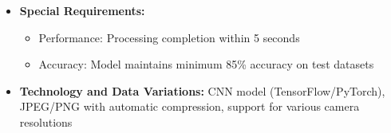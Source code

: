 \begin{itemize}
\begin{itemize}
        \item 4a. Confidence below 85\%: System provides top 3 alternative breed matches
        \item 6a. User disagrees: User can manually correct breed identification
    \end{itemize}
    \item \textbf{Special Requirements:}
    \begin{itemize}
        \item Performance: Processing completion within 5 seconds
        \item Accuracy: Model maintains minimum 85\% accuracy on test datasets
    \end{itemize}
    \item \textbf{Technology and Data Variations:} CNN model (TensorFlow/PyTorch), JPEG/PNG with automatic compression, support for various camera resolutions
\end{itemize}


